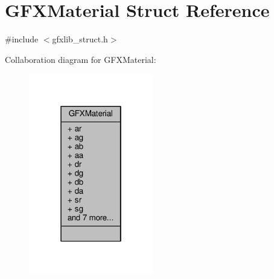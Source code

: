 \hypertarget{structGFXMaterial}{}\section{G\+F\+X\+Material Struct Reference}
\label{structGFXMaterial}


{\ttfamily \#include $<$gfxlib\+\_\+struct.\+h$>$}



Collaboration diagram for G\+F\+X\+Material\+:
\nopagebreak
\begin{figure}[H]
\begin{center}
\leavevmode
\includegraphics[width=154pt]{d5/d7c/structGFXMaterial__coll__graph}
\end{center}
\end{figure}
